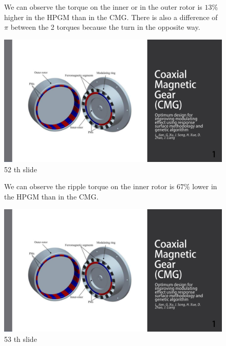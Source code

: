 \begin{figure}[H]
    \begin{minipage}{.45\linewidth}
  We can observe the torque on the inner or in the outer rotor is $13 \%$ higher in the HPGM than in the CMG. There is also a difference of $\pi$ between the 2 torques because the turn in the opposite way.
    \end{minipage}
    \hfill%
    \begin{minipage}[c]{.45\linewidth}
        \centering
        \includegraphics[page={52},width=\textwidth]{LELEC2311.allow.pdf}
        \caption{52 th slide}
    \end{minipage}
\end{figure}


\begin{figure}[H]
    \begin{minipage}{.45\linewidth}
  We can observe the ripple torque on the inner rotor is $67 \%$ lower in the HPGM than in the CMG. 
    \end{minipage}
    \hfill%
    \begin{minipage}[c]{.45\linewidth}
        \centering
        \includegraphics[page={53},width=\textwidth]{LELEC2311.allow.pdf}
        \caption{53 th slide}
    \end{minipage}
\end{figure}


